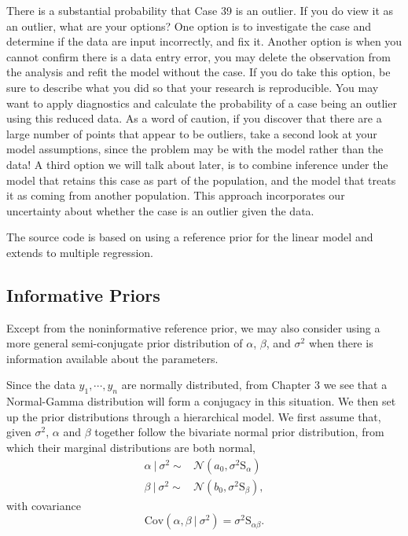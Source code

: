 \documentclass[]{book}
\theoremstyle{definition}
\theoremstyle{definition}
\theoremstyle{definition}
\theoremstyle{remark}
\begin{document}
There is a substantial probability that Case 39 is an outlier. If you do
view it as an outlier, what are your options? One option is to
investigate the case and determine if the data are input incorrectly,
and fix it. Another option is when you cannot confirm there is a data
entry error, you may delete the observation from the analysis and refit
the model without the case. If you do take this option, be sure to
describe what you did so that your research is reproducible. You may
want to apply diagnostics and calculate the probability of a case being
an outlier using this reduced data. As a word of caution, if you
discover that there are a large number of points that appear to be
outliers, take a second look at your model assumptions, since the
problem may be with the model rather than the data! A third option we
will talk about later, is to combine inference under the model that
retains this case as part of the population, and the model that treats
it as coming from another population. This approach incorporates our
uncertainty about whether the case is an outlier given the data.

The source code is based on using a reference prior for the linear model
and extends to multiple regression.

\subsection{Informative Priors}\label{informative-priors}

Except from the noninformative reference prior, we may also consider
using a more general semi-conjugate prior distribution of \(\alpha\),
\(\beta\), and \(\sigma^2\) when there is information available about
the parameters.

Since the data \(y_1,\cdots,y_n\) are normally distributed, from Chapter
3 we see that a Normal-Gamma distribution will form a conjugacy in this
situation. We then set up the prior distributions through a hierarchical
model. We first assume that, given \(\sigma^2\), \(\alpha\) and
\(\beta\) together follow the bivariate normal prior distribution, from
which their marginal distributions are both normal, \[ 
\begin{aligned}
\alpha~|~\sigma^2 \sim & \mathcal{N}(a_0, \sigma^2\text{S}_\alpha) \\
\beta ~|~ \sigma^2 \sim & \mathcal{N}(b_0, \sigma^2\text{S}_\beta),
\end{aligned}
\] with covariance
\[ \text{Cov}(\alpha, \beta ~|~\sigma^2) =\sigma^2 \text{S}_{\alpha\beta}. \]
\end{document}
